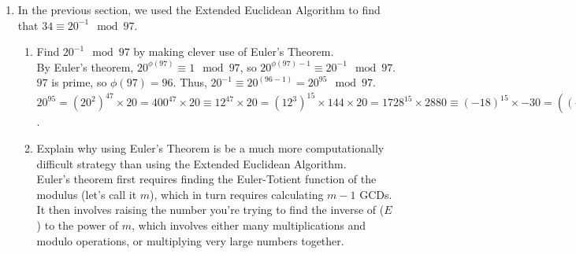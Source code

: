 \documentclass{article}
\begin{document}
\begin{enumerate}
        \begin{verbatim}
def extendedAlgorithm(a, b):
    equations = euclideanGCD(a, b)
    g = equations[-1]['b']
    if len(equations) < 2:
        print(str(g) + " = " + str(equations[0]['a']) + "*0 + "
            + str(equations[0]['b']) + "*1") 
        return {'gcd':g, 'a':equations[0]['a'], 'x':0, 'b':equations[0]['b'], 'y':1}
    equations=equations[-2::-1]
    a = 1
    x = equations[0]['a']
    b = -equations[0]['q']
    y = equations[0]['b']
    for i in range(1, len(equations)):
        newA = b
        newX = equations[i]['a']
        newB = a + b * -equations[i]['q']
        newY = x
        a, x, b, y = newA, newX, newB, newY
    print(str(g) + " = " + str(a) + "*" + str(x) + " + " + str(b) + "*" + str(y)) 
    return {'gcd':g, 'a':a, 'x':x, 'b':b, 'y':y}
        \end{verbatim}
        \begin{enumerate}
            \item $9 = -1371742\cdot9876543210 + 109739361\cdot123456789$
            \item $1 = 99009901\cdot11111111111 + -1100110010\cdot1000000001$
            \item $3 = -6495686882417\cdot73433510078091009 + 10445427205865236\cdot45666020043321$
        \end{enumerate}
    \item In the previous section, we used the Extended Euclidean Algorithm to find that $34 \equiv 20^{-1} \mod{97}$.
    \begin{enumerate}
        \item Find $20^{-1} \mod{97}$ by making clever use of Euler’s Theorem.\\
        By Euler's theorem, $20^{\phi(97)} \equiv 1 \mod{97}$, so $20^{\phi(97)-1} \equiv 20^{-1} \mod{97}$. $97$ is prime, so $\phi(97) = 96$. Thus, $20^{-1} \equiv 20^(96-1) = 20^{95} \mod{97}$. $20^{95} = (20^{2})^{47} \times 20 = 400^{47} \times 20 \equiv 12^{47} \times 20 = (12^{3})^{15} \times 144 \times 20 = 1728^{15} \times 2880 \equiv (-18)^{15} \times -30 = ((-18)^{2})^{7} \times -18 \times -30 = 324^{7} \times 540 \equiv 33^{7} \times 55 = (33^{2})^{3} \times 33 \times 55 = 1089^{3} \times 1815 \equiv 22^{3} \times 69 = 10648 \times 69 \equiv 75 \times 69 = 5175 \equiv 34$.
        \item Explain why using Euler’s Theorem is be a much more computationally difficult strategy than using the Extended Euclidean Algorithm.\\
        Euler's theorem first requires finding the Euler-Totient function of the modulus (let's call it $m$), which in turn requires calculating $m-1$ GCDs. It then involves raising the number you're trying to find the inverse of ($E$) to the power of $m$, which involves either many multiplications and modulo operations, or multiplying very large numbers together.\\

\end{enumerate}
\end{enumerate}
\end{document}
